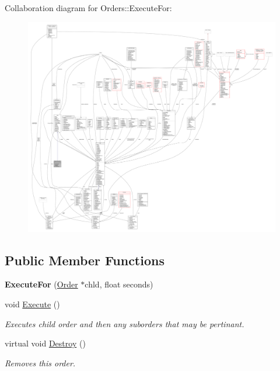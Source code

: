 Collaboration diagram for Orders\+:\+:Execute\+For\+:
\nopagebreak
\begin{figure}[H]
\begin{center}
\leavevmode
\includegraphics[width=350pt]{d4/d24/classOrders_1_1ExecuteFor__coll__graph}
\end{center}
\end{figure}
\subsection*{Public Member Functions}
\begin{DoxyCompactItemize}
\item 
{\bfseries Execute\+For} (\hyperlink{classOrder}{Order} $\ast$chld, float seconds)\hypertarget{classOrders_1_1ExecuteFor_a3896b304281907f21a568b62e145b59b}{}\label{classOrders_1_1ExecuteFor_a3896b304281907f21a568b62e145b59b}

\item 
void \hyperlink{classOrders_1_1ExecuteFor_a1801ada418e5606f44ea1e5fc59c0369}{Execute} ()\hypertarget{classOrders_1_1ExecuteFor_a1801ada418e5606f44ea1e5fc59c0369}{}\label{classOrders_1_1ExecuteFor_a1801ada418e5606f44ea1e5fc59c0369}

\begin{DoxyCompactList}\small\item\em Executes child order and then any suborders that may be pertinant. \end{DoxyCompactList}\item 
virtual void \hyperlink{classOrders_1_1ExecuteFor_a00cb6375b7f0afc14ef6d178d4746d3b}{Destroy} ()\hypertarget{classOrders_1_1ExecuteFor_a00cb6375b7f0afc14ef6d178d4746d3b}{}\label{classOrders_1_1ExecuteFor_a00cb6375b7f0afc14ef6d178d4746d3b}

\begin{DoxyCompactList}\small\item\em Removes this order. \end{DoxyCompactList}\end{DoxyCompactItemize}
